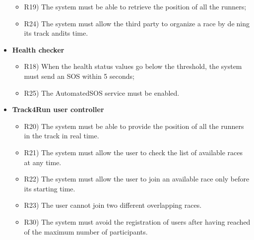 \begin{itemize}
		\begin{itemize}
			\item R19) The system must be able to retrieve the position of all the runners;\\
			\item R24) The system must allow the third party to organize a race by dening its track andits time.\\
		\end{itemize}
		\item \textbf{Health checker}
		\begin{itemize}
			\item R18) When the health status values go below the threshold, the system must send an SOS within 5 seconds;\\
			\item R25) The AutomatedSOS service must be enabled.\\
		\end{itemize}
		\item \textbf{Track4Run user controller}
		\begin{itemize}
			\item R20) The system must be able to provide the position of all the runners in the track in real time.\\
			\item R21) The system must allow the user to check the list of available races at any time.\\
			\item R22) The system must allow the user to join an available race only before its starting time.\\
			\item R23) The user cannot join two different overlapping races.\\
			\item R30) The system must avoid the registration of users after having reached of the maximum number of participants.\\
		\end{itemize}
	\end{itemize}
	
